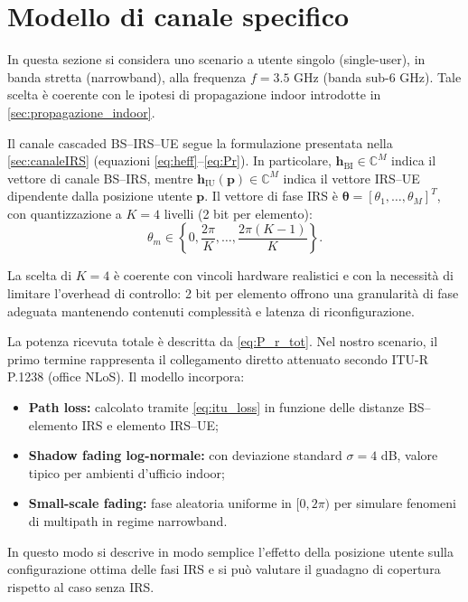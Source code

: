 \documentclass[12pt,a4paper]{report}
\begin{document}
\section{Modello di canale specifico}
In questa sezione si considera uno scenario a utente singolo
(single-user), in banda stretta (narrowband), alla frequenza $f =
3.5$ GHz (banda sub-6 GHz). Tale scelta è coerente con le ipotesi di
propagazione indoor introdotte in \cref{sec:propagazione_indoor}.

Il canale cascaded BS--IRS--UE segue la formulazione presentata nella
\cref{sec:canaleIRS} (equazioni \eqref{eq:heff}--\eqref{eq:Pr}). In
particolare, $\mathbf{h}_{\text{BI}} \in \mathbb{C}^{M}$ indica il
vettore di canale BS--IRS, mentre $\mathbf{h}_{\text{IU}}(\mathbf{p})
\in \mathbb{C}^{M}$ indica il vettore IRS--UE dipendente dalla
posizione utente $\mathbf{p}$. Il vettore di fase IRS è
$\boldsymbol{\theta} = [\theta_1, \dots, \theta_M]^T$, con
quantizzazione a $K=4$ livelli (2 bit per elemento):
\begin{equation}
  \theta_m \in \left\{0, \frac{2\pi}{K}, \dots, \frac{2\pi(K-1)}{K}\right\}.
  \label{eq:theta_quantized}
\end{equation}

La scelta di $K=4$ è coerente con vincoli hardware realistici e con
la necessità di limitare l'overhead di controllo: 2 bit per elemento
offrono una granularità di fase adeguata mantenendo contenuti
complessità e latenza di riconfigurazione.

La potenza ricevuta totale è descritta da \eqref{eq:P_r_tot}. Nel
nostro scenario, il primo termine rappresenta il collegamento diretto
attenuato secondo ITU-R P.1238 (office NLoS). Il modello incorpora:
\begin{itemize}
  \item \textbf{Path loss:} calcolato tramite \eqref{eq:itu_loss} in
    funzione delle distanze BS--elemento IRS e elemento IRS--UE;
  \item \textbf{Shadow fading log-normale:} con deviazione standard
    $\sigma = 4$ dB, valore tipico per ambienti d'ufficio indoor;
  \item \textbf{Small-scale fading:} fase aleatoria uniforme in $[0,
    2\pi)$ per simulare fenomeni di multipath in regime narrowband.
\end{itemize}

In questo modo si descrive in modo semplice l'effetto della posizione
utente sulla configurazione ottima delle fasi IRS e si può valutare
il guadagno di copertura rispetto al caso senza IRS.
\end{document}
